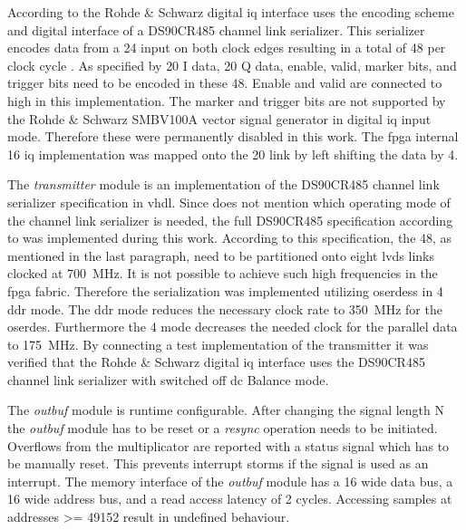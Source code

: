 \documentclass[12pt,a4paper,parskip=full,abstract=true,BCOR=12mm]{scrreprt}
\def\device#1{\mbox{\textit{#1}}}
\begin{document}
According to \cite{fsq_b17} the Rohde \& Schwarz digital \gls{iq} interface
uses the encoding scheme and digital interface of a DS90CR485 channel link
serializer. This serializer encodes data from a \SI{24}{\bit} input on both
clock edges resulting in a total of \SI{48}{\bit} per clock cycle \cite{ds90cr485}.
As specified by \cite{fsq_b17} \SI{20}{\bit} I data, \SI{20}{\bit} Q data, enable,
valid, marker bits, and trigger bits need to be encoded in these \SI{48}{\bit}. Enable
and valid are connected to high in this implementation. The marker and trigger
bits are not supported by the Rohde \& Schwarz SMBV100A vector signal generator
in digital \gls{iq} input mode. Therefore these were permanently disabled in this
work. The \gls{fpga} internal \SI{16}{\bit} \gls{iq} implementation was mapped
onto the \SI{20}{\bit} link by left shifting the data by \SI{4}{\bit}.

The \device{transmitter} module is an implementation of the DS90CR485 channel
link serializer specification in \gls{vhdl}. Since \cite{fsq_b17} does not
mention which operating mode of the channel link serializer is needed, the
full DS90CR485 specification according to \cite{ds90cr485} was implemented during this work.
According to this specification, the \SI{48}{\bit}, as mentioned in the last
paragraph, need to be partitioned onto eight \gls{lvds} links clocked at
\SI{700}{\mega\hertz}. It is not possible to achieve such high frequencies
in the \gls{fpga} fabric. Therefore the serialization was implemented utilizing
\glspl{oserdes} in \SI{4}{\bit} \gls{ddr} mode. The \gls{ddr} mode reduces the
necessary clock rate to \SI{350}{\mega\hertz} for the \gls{oserdes}. Furthermore the
\SI{4}{\bit} mode decreases the needed clock for the parallel data to
\SI{175}{\mega\hertz}. By connecting a test implementation of the transmitter
it was verified that the Rohde \& Schwarz digital \gls{iq} interface uses the
DS90CR485 channel link serializer with switched off \gls{dc} Balance mode.

The \device{outbuf} module is runtime configurable. After changing the signal
length \gls{N} the \device{outbuf} module has to be reset or a \device{resync} operation
needs to be initiated. Overflows from the multiplicator are reported with a status
signal which has to be manually reset. This prevents interrupt storms if the signal is
used as an interrupt. The memory interface of the \device{outbuf}
module has a \SI{16}{\bit} wide data bus, a \SI{16}{\bit} wide address bus, and a read access
latency of 2 cycles. Accessing samples at addresses \num{>= 49152} result in undefined behaviour.
\end{document}
